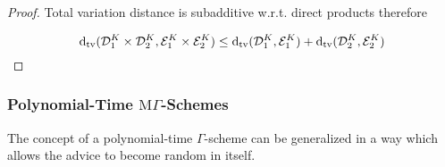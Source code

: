 \documentclass{article}
\numberwithin{equation}{section}
\theoremstyle{definition}
\theoremstyle{plain}
\newcommand{\Dtv}{\operatorname{d}_{\textnormal{tv}}}
\newcommand{\Dist}{\mathcal{D}}
\newcommand{\MGrow}{\mathrm{M}\Gamma}
\begin{document}
\begin{proof}

Total variation distance is subadditive w.r.t. direct products therefore 

\[\Dtv(\Dist_1^K \times \Dist_2^K, \mathcal{E}_1^K \times \mathcal{E}_2^K) \leq \Dtv(\Dist_1^K, \mathcal{E}_1^K) + \Dtv(\Dist_2^K, \mathcal{E}_2^K)\]
\end{proof}

\subsubsection{Polynomial-Time \texorpdfstring{$\MGrow$}{MΓ}-Schemes}

The concept of a polynomial-time $\Gamma$-scheme can be generalized in a way which allows the advice to become random in itself.
\end{document}
